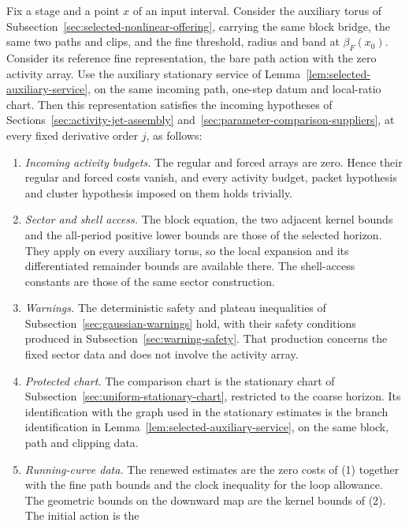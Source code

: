 \begin{lemma}
\label{lem:selected-chartlet-matching}
Fix a stage and a point $x$ of an input interval. Consider the auxiliary
torus of Subsection~\ref{sec:selected-nonlinear-offering}, carrying the
same block bridge, the same two paths and clips, and the fine threshold,
radius and band at $\beta_F(x_0)$. Consider its reference fine
representation, the bare path action with the zero activity array.
Use the auxiliary stationary service of
Lemma~\ref{lem:selected-auxiliary-service}, on the same incoming path,
one-step datum and local-ratio chart. Then this
representation satisfies the incoming hypotheses of
Sections~\ref{sec:activity-jet-assembly}
and~\ref{sec:parameter-comparison-suppliers}, at every fixed derivative
order $j$, as follows:
\begin{enumerate}
\item \emph{Incoming activity budgets.} The regular and forced arrays
  are zero. Hence their regular and forced costs vanish, and every
  activity budget, packet hypothesis and cluster hypothesis imposed on
  them holds trivially.
\item \emph{Sector and shell access.} The block equation, the two
  adjacent kernel bounds and the all-period positive lower bounds are
  those of the selected horizon. They apply on every auxiliary torus, so
  the local expansion and its differentiated remainder bounds are
  available there. The shell-access constants are those of the same
  sector construction.
\item \emph{Warnings.} The deterministic safety and plateau inequalities
  of Subsection~\ref{sec:gaussian-warnings} hold, with their safety
  conditions produced in Subsection~\ref{sec:warning-safety}. That
  production concerns the fixed sector data and does not involve the
  activity array.
\item \emph{Protected chart.} The comparison chart is the stationary
  chart of Subsection~\ref{sec:uniform-stationary-chart}, restricted to the
  coarse horizon. Its identification with the graph used in the
  stationary estimates is the branch identification in Lemma~\ref{lem:selected-auxiliary-service}, on the same block, path and
  clipping data.
\item \emph{Running-curve data.} The renewed estimates are the zero
  costs of (1) together with the fine path bounds and the clock
  inequality for the loop allowance. The geometric bounds on the
  downward map are the kernel bounds of (2). The initial action is the

\end{enumerate}
\end{lemma}
